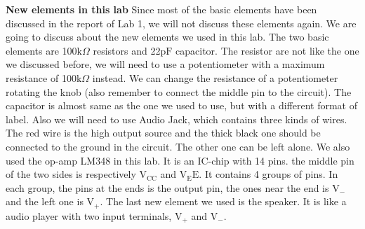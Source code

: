 \textbf{New elements in this lab} \newline
\phantom{ } Since most of the basic elements have been discussed in the report of Lab 1, we will not discuss these elements again. We are going to discuss about the new elements we used in this lab. The two basic elements are 100$ \si{\kilo\Omega} $ resistors and 22$\si{\pico\farad}$ capacitor. The resistor are not like the one we discussed before, we will need to use a potentiometer with a maximum resistance of 100$ \si{\kilo\Omega} $ instead. We can change the resistance of a potentiometer rotating the knob (also remember to connect the middle pin to the circuit). The capacitor is almost same as the one we used to use, but with a different format of label. Also we will need to use Audio Jack, which contains three kinds of wires. The red wire is the high output source and the thick black one should be connected to the ground in the circuit. The other one can be left alone. We also used the op-amp LM348 in this lab. It is an IC-chip with 14 pins. the middle pin of the two sides is respectively $ \mathrm{V_{CC}} $ and $ \mathrm{V_EE} $. It contains 4 groups of pins. In each group, the pins at the ends is the output pin, the ones near the end is $ \mathrm{V_-} $ and the left one is $ \mathrm{V_+} $. The last new element we used is the speaker. It is like a audio player with two input terminals, $ \mathrm{V_+} $ and  $ \mathrm{V_-} $.
